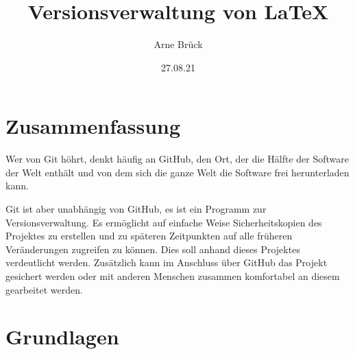 \documentclass[11pt]{article}
\title{Versionsverwaltung von \LaTeX{}}
\author{Arne Brück}
\date{27.08.21}
\begin{document}
\maketitle

\section{Zusammenfassung}
Wer von Git höhrt, denkt häufig an GitHub, den Ort, der die Hälfte der
Software der Welt enthält und von dem sich die ganze Welt die Software
frei herunterladen kann.

Git ist aber unabhängig von GitHub, es ist ein Programm zur
Versionsverwaltung. Es ermöglicht auf einfache Weise Sicherheitskopien
des Projektes zu erstellen und zu späteren Zeitpunkten auf alle
früheren Veränderungen zugreifen zu können. Dies soll anhand dieses
Projektes verdeutlicht werden. Zusätzlich kann im Anschluss über
GitHub das Projekt gesichert werden oder mit anderen Menschen zusammen
komfortabel an diesem gearbeitet werden.

\section{Grundlagen}

\end{document}
